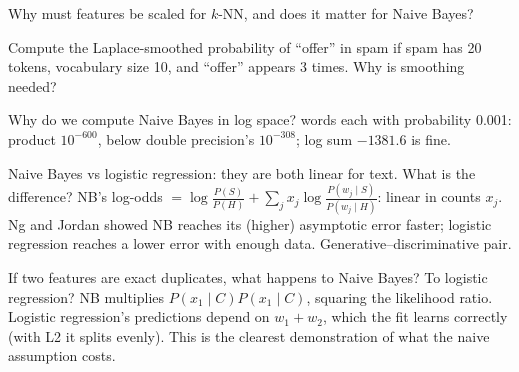 \begin{qa}{Why must features be scaled for $k$-NN, and does it matter for Naive Bayes?}
\end{qa}

\begin{qa}{Compute the Laplace-smoothed probability of ``offer'' in spam if spam has 20 tokens, vocabulary size 10, and ``offer'' appears
3 times. Why is smoothing needed?}
\end{qa}

\begin{qa}{Why do we compute Naive Bayes in log space?}
 words each with probability 0.001: product $10^{-600}$, below double precision's $10^{-308}$; log sum $-1381.6$ is fine.
\end{qa}

\begin{qa}{\deep Naive Bayes vs logistic regression: they are both linear for text. What is the difference?}
\why NB's log-odds $=\log\frac{P(S)}{P(H)} + \sum_jx_j\log\frac{P(w_j\mid S)}{P(w_j\mid H)}$: linear in counts $x_j$. Ng and Jordan showed
NB reaches its (higher) asymptotic error faster; logistic regression reaches a lower error with enough data. Generative--discriminative pair.
\end{qa}

\begin{qa}{\deep If two features are exact duplicates, what happens to Naive Bayes? To logistic regression?}
\why NB multiplies $P(x_1\mid C)P(x_1\mid C)$, squaring the likelihood ratio. Logistic regression's predictions depend on $w_1 + w_2$, which
the fit learns correctly (with L2 it splits evenly). This is the clearest demonstration of what the naive assumption costs.
\end{qa}

